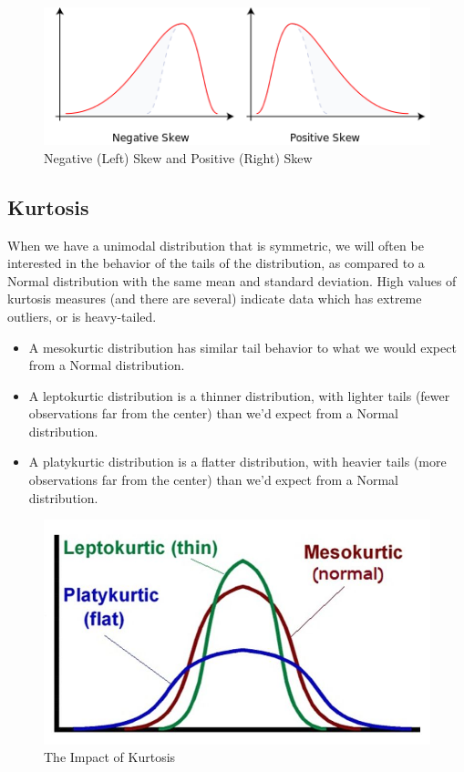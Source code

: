 \documentclass[
]{book}
\providecommand{\tightlist}{%
  \setlength{\itemsep}{0pt}\setlength{\parskip}{0pt}}
\begin{document}
\begin{figure}
\includegraphics[width=0.9\linewidth]{figures/negandposskew} \caption{Negative (Left) Skew and Positive (Right) Skew}\label{fig:negandposskew-fig}
\end{figure}

\hypertarget{kurtosis}{%
\subsection{Kurtosis}\label{kurtosis}}

When we have a unimodal distribution that is symmetric, we will often be interested in the behavior of the tails of the distribution, as compared to a Normal distribution with the same mean and standard deviation. High values of kurtosis measures (and there are several) indicate data which has extreme outliers, or is heavy-tailed.

\begin{itemize}
\tightlist
\item
  A mesokurtic distribution has similar tail behavior to what we would expect from a Normal distribution.
\item
  A leptokurtic distribution is a thinner distribution, with lighter tails (fewer observations far from the center) than we'd expect from a Normal distribution.
\item
  A platykurtic distribution is a flatter distribution, with heavier tails (more observations far from the center) than we'd expect from a Normal distribution.
\end{itemize}

\begin{figure}
\includegraphics[width=0.9\linewidth]{figures/kurtosis} \caption{The Impact of Kurtosis}\label{fig:kurtosis-fig}
\end{figure}
\end{document}
